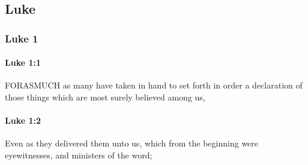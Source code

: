 \subsection{Luke}
	\label{LUKE}

	\subsubsection{Luke 1} %
		\label{LUKE-1}
		
		\paragraph{Luke 1:1} %
			\label{LUKE-1-1}

			FORASMUCH as many have taken in hand to set forth in order a declaration of those things which are most surely believed among us,

			\begin{framed}
			\scriptsize
				\begin{compactdesc}
					\item[SBLG] 
				\end{compactdesc}
			\end{framed}

		\paragraph{Luke 1:2} %
			\label{LUKE-1-2}

			Even as they delivered them unto us, which from the beginning were eyewitnesses, and ministers of the word;

